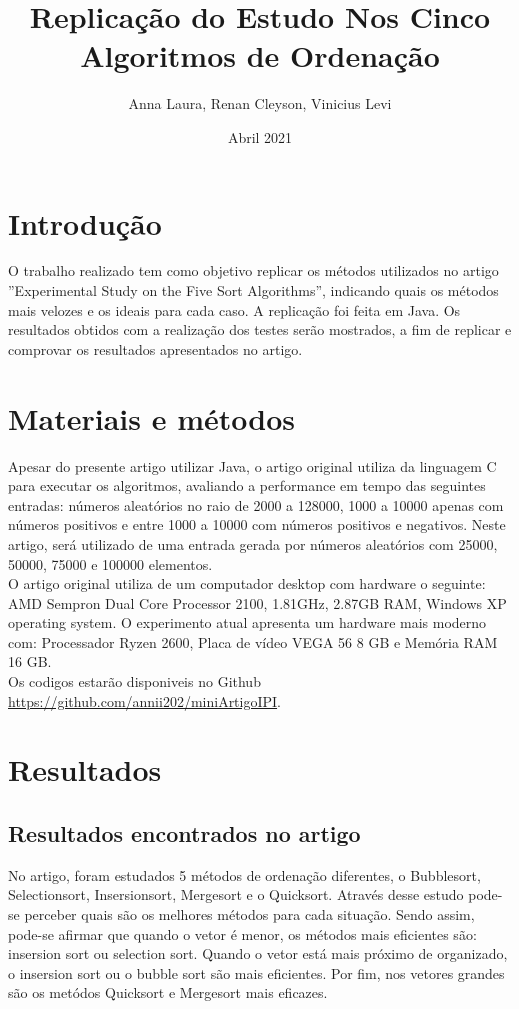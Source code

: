 \documentclass[a4paper.12pt]{article}
\title{Replicação do Estudo Nos Cinco Algoritmos de Ordenação}
\author{Anna Laura, Renan Cleyson, Vinicius Levi}
\date{Abril 2021}
\begin{document}
\maketitle
\newpage
\section{Introdução}
O trabalho realizado tem como objetivo replicar os métodos utilizados no artigo ''Experimental Study on the Five Sort Algorithms'', indicando quais os métodos mais velozes e os ideais para cada caso. A replicação foi feita em Java. Os resultados obtidos com a realização dos testes serão mostrados, a fim de replicar e comprovar os resultados apresentados no artigo.
 
 
\section {Materiais e métodos}
Apesar do presente artigo utilizar Java, o artigo original utiliza da linguagem C para executar os algoritmos, avaliando a performance em tempo das seguintes entradas: números aleatórios no raio de 2000 a 128000, 1000 a 10000 apenas com números positivos e entre 1000 a 10000 com números positivos e negativos. Neste artigo, será utilizado de uma entrada gerada por números aleatórios com 25000, 50000, 75000 e 100000 elementos.\\
O artigo original utiliza de um computador desktop com hardware o seguinte: AMD Sempron Dual Core Processor 2100, 1.81GHz, 2.87GB RAM, Windows XP operating system. O experimento atual apresenta um hardware mais moderno com: Processador Ryzen 2600, Placa de vídeo VEGA 56 8 GB e Memória RAM 16 GB.\\
Os codigos estarão disponiveis no Github \href{https://github.com/annii202/miniArtigoIPI}{https://github.com/annii202/miniArtigoIPI}.
\section {Resultados}

\subsection{Resultados encontrados no artigo}


No artigo, foram estudados 5 métodos de ordenação diferentes, o Bubblesort, Selectionsort, Insersionsort, Mergesort e o Quicksort. Através desse estudo pode-se perceber quais são os melhores métodos para cada situação. Sendo assim, pode-se afirmar que quando o vetor é menor, os métodos mais eficientes são: insersion sort ou selection sort. Quando o vetor está mais próximo de organizado, o insersion sort ou o bubble sort são mais eficientes. Por fim, nos vetores grandes são os metódos Quicksort e Mergesort mais eficazes.
\end{document}
